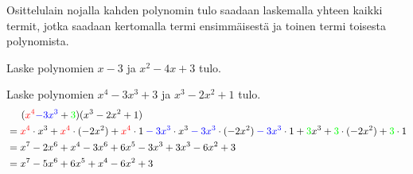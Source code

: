 Osittelulain nojalla kahden polynomin tulo saadaan laskemalla yhteen kaikki
termit, jotka saadaan kertomalla termi ensimmäisestä ja toinen termi toisesta
polynomista.



\begin{esimerkki}
Laske polynomien $x-3$ ja $x^2-4x+3$ tulo. \\
\newline
\end{esimerkki}

\begin{esimerkki}
Laske polynomien $x^4-3x^3+3$ ja $x^3-2x^2+1$ tulo. \\
\begin{align*}
&\hspace{0.5cm}(\textcolor{red}{x^4} \textcolor{blue}{-3x^3} +{}\textcolor{green}{3})(x^3-2x^2+1) \\
&= \textcolor{red}{x^4}\cdot x^3 + \textcolor{red}{x^4}\cdot (-2x^2)+\textcolor{red}{x^4}\cdot 1\textcolor{blue}{{}-3x^3}\cdot x^3\textcolor{blue}{{}-3x^3}\cdot(-2x^2)\textcolor{blue}{{}-3x^3}\cdot1+\textcolor{green}{3}x^3+\textcolor{green}{3}\cdot(-2x^2)+\textcolor{green}{3}\cdot 1 \\
&= x^7-2x^6+x^4-3x^6+6x^5-3x^3+3x^3-6x^2+3 \\
&= x^7-5x^6+6x^5+x^4-6x^2+3
\end{align*}
\end{esimerkki}


